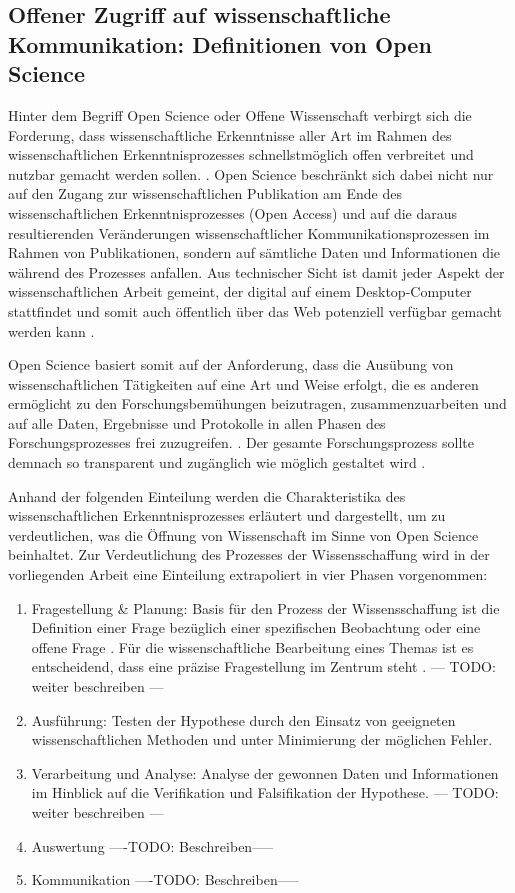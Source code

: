 \subsection{Offener Zugriff auf wissenschaftliche Kommunikation: Definitionen von Open Science}

Hinter dem Begriff Open Science oder Offene Wissenschaft verbirgt sich die Forderung, dass wissenschaftliche Erkenntnisse aller Art im Rahmen des wissenschaftlichen Erkenntnisprozesses schnellstmöglich offen verbreitet und nutzbar gemacht werden sollen. \cite{https://lists.okfn.org/pipermail/open-science/2011-July/000907.html}. Open Science beschränkt sich dabei nicht nur auf den Zugang zur wissenschaftlichen Publikation am Ende des wissenschaftlichen Erkenntnisprozesses (Open Access) und auf die daraus resultierenden Veränderungen wissenschaftlicher Kommunikationsprozessen im Rahmen von Publikationen, sondern auf sämtliche Daten und Informationen die während des Prozesses anfallen. Aus technischer Sicht ist damit jeder Aspekt der wissenschaftlichen Arbeit gemeint, der digital auf einem Desktop-Computer stattfindet und somit auch öffentlich über das Web potenziell verfügbar gemacht werden kann \cite{mietchen2012wissenschaft}.

Open Science basiert somit auf der Anforderung, dass die Ausübung von wissenschaftlichen Tätigkeiten auf eine Art und Weise erfolgt, die es anderen ermöglicht zu den Forschungsbemühungen beizutragen, zusammenzuarbeiten und auf alle Daten, Ergebnisse und Protokolle in allen Phasen des Forschungsprozesses frei zuzugreifen. \cite{http://www.rin.ac.uk/our-work/data-management-and-curation/open-science-case-studies}. Der gesamte Forschungsprozess sollte demnach so transparent und zugänglich wie möglich gestaltet wird \cite{Scheliga_2014}.

Anhand der folgenden Einteilung werden die Charakteristika des wissenschaftlichen Erkenntnisprozesses erläutert und dargestellt, um zu verdeutlichen, was die Öffnung von Wissenschaft im Sinne von Open Science beinhaltet. Zur Verdeutlichung des Prozesses der Wissensschaffung wird in der vorliegenden Arbeit eine Einteilung extrapoliert in vier Phasen vorgenommen:
\begin{enumerate}
\item Fragestellung & Planung: Basis für den Prozess der Wissensschaffung ist die Definition einer Frage bezüglich einer spezifischen Beobachtung oder eine offene Frage \cite{suchen}. Für die wissenschaftliche Bearbeitung eines Themas ist es entscheidend, dass eine präzise Fragestellung im Zentrum steht \cite{suchen}. --- TODO: weiter beschreiben ---
\item Ausführung: Testen der Hypothese durch den Einsatz von geeigneten wissenschaftlichen Methoden und unter Minimierung der möglichen Fehler.
\item Verarbeitung und Analyse: Analyse der gewonnen Daten und Informationen im Hinblick auf die Verifikation und Falsifikation der Hypothese. --- TODO: weiter beschreiben ---
\item Auswertung ----TODO: Beschreiben-----
\item Kommunikation ----TODO: Beschreiben-----
\end{enumerate}


